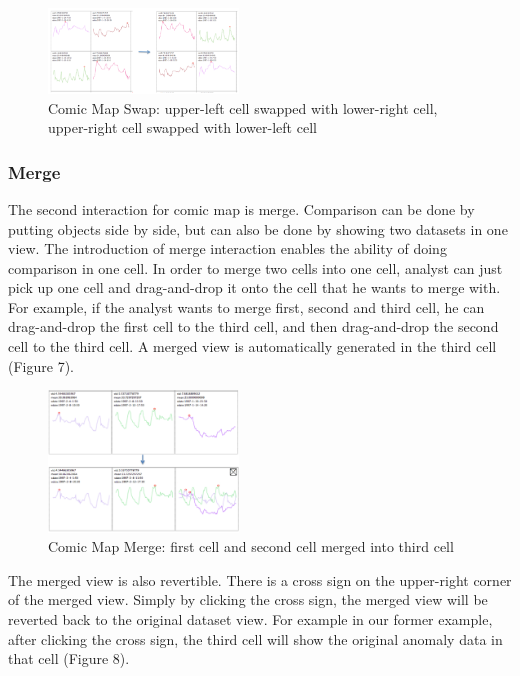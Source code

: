 \documentclass{vgtc}                          %
\begin{document}
\begin{figure}[htb]
	\centering
	\includegraphics[width=0.45\textwidth]{swap.jpg}
	\caption{Comic Map Swap: upper-left cell swapped with lower-right cell, upper-right cell swapped with lower-left cell}
\end{figure}

\subsubsection{Merge}
The second interaction for comic map is merge. Comparison can be done by putting objects side by side, but can also be done by showing two datasets in one view. The introduction of merge interaction enables the ability of doing comparison in one cell. 
In order to merge two cells into one cell, analyst can just pick up one cell and drag-and-drop it onto the cell that he wants to merge with. For example, if the analyst wants to merge first, second and third cell, he can drag-and-drop the first cell to the third cell, and then drag-and-drop the second cell to the third cell. A merged view is automatically generated in the third cell (Figure 7).

\begin{figure}[htb]
	\centering
	\includegraphics[width=0.45\textwidth]{merge.jpg}
	\caption{Comic Map Merge: first cell and second cell merged into third cell}
\end{figure}
 
The merged view is also revertible. There is a cross sign on the upper-right corner of the merged view. Simply by clicking the cross sign, the merged view will be reverted back to the original dataset view. For example in our former example, after clicking the cross sign, the third cell will show the original anomaly data in that cell (Figure 8).
\end{document}
